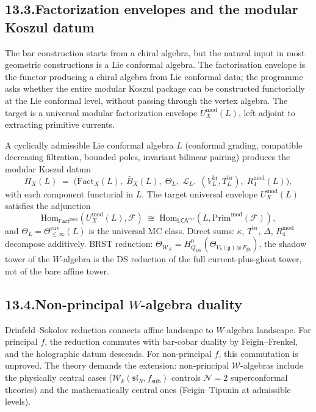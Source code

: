 \documentclass[11pt,reqno]{amsart}
\theoremstyle{definition}
\theoremstyle{remark}
\providecommand{\cF}{\mathcal{F}}
\providecommand{\cL}{\mathcal{L}}
\providecommand{\cN}{\mathcal{N}}
\providecommand{\cW}{\mathcal{W}}
\providecommand{\Hom}{\mathrm{Hom}}
\providecommand{\fg}{\mathfrak{g}}
\providecommand{\DS}{\mathrm{DS}}
\providecommand{\cyc}{\mathrm{cyc}}
\providecommand{\gh}{\mathrm{gh}}
\numberwithin{equation}{section}
\begin{document}
\subsection*{13.3.\enspace Factorization envelopes and the modular Koszul datum}

The bar construction starts from a chiral algebra, but the
natural input in most geometric constructions is a Lie conformal
algebra. The factorisation envelope is the functor producing a
chiral algebra from Lie conformal data; the programme asks
whether the entire modular Koszul package can be constructed
functorially at the Lie conformal level, without passing
through the vertex algebra. The target is a universal modular
factorization envelope $U^{\mathrm{mod}}_X(L)$, left adjoint to
extracting primitive currents.

A cyclically admissible Lie conformal algebra $L$ (conformal
grading, compatible decreasing filtration, bounded poles,
invariant bilinear pairing) produces the modular Koszul datum
\[
\Pi_X(L)
\;=\;
\bigl(
\mathrm{Fact}_X(L),\;
\bar B_X(L),\;
\Theta_L,\;
\cL_L,\;
(V^{\mathrm{br}}_L, T^{\mathrm{br}}_L),\;
R_4^{\mathrm{mod}}(L)
\bigr),
\]
with each component functorial in $L$. The target universal
envelope $U^{\mathrm{mod}}_X(L)$ satisfies the adjunction
\[
\Hom_{\mathsf{Fact}^{\mathrm{mod}}}(U^{\mathrm{mod}}_X(L), \cF)
\;\cong\;
\Hom_{\mathsf{LCA}^{\cyc}}(L, \mathrm{Prim}^{\mathrm{mod}}(\cF)),
\]
and $\Theta_L = \Theta^{\mathrm{env}}_{\le\infty}(L)$ is the
universal MC class. Direct sums: $\kappa$, $T^{\mathrm{br}}$,
$\Delta$, $R_4^{\mathrm{mod}}$ decompose additively. BRST reduction:
$\Theta_{\cW_N} = H^0_{Q_{\DS}}(\Theta_{V_k(\fg)\otimes F_{\gh}})$,
the shadow tower of the $W$-algebra is the DS reduction of
the full current-plus-ghost tower, not of the bare affine tower.

\subsection*{13.4.\enspace Non-principal $W$-algebra duality}

Drinfeld--Sokolov reduction connects affine landscape to
$W$-algebra landscape. For principal $f$, the reduction commutes
with bar-cobar duality by Feigin--Frenkel, and the holographic
datum descends. For non-principal $f$, this commutation is
unproved. The theory demands the extension: non-principal
$\cW$-algebras include the physically central cases
($\cW_k(\mathfrak{sl}_N, f_{\mathrm{sub}})$ controls $\cN = 2$
superconformal theories) and the mathematically central ones
(Feigin--Tipunin at admissible levels).
\end{document}
